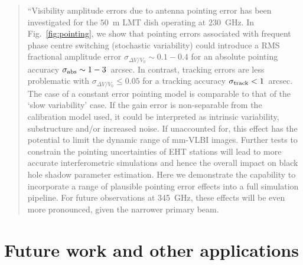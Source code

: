 \begin{quotation}
``Visibility amplitude errors due to antenna pointing error has been investigated for the $50$~m  LMT dish operating at $230$~GHz. In Fig.~\ref{fig:pointing}, we show that pointing errors associated with frequent phase centre switching (stochastic variability) could introduce a RMS fractional amplitude error $\sigma_{\Delta V/V_0} \sim 0.1 - 0.4$ for an absolute pointing accuracy  $\sigma_{\rm abs} \sim 1-3$~arcsec. In contrast, tracking errors are less problematic with $\sigma_{\Delta V/V_0} \le 0.05$ for a tracking accuracy  $\sigma_{\rm track}<1$~arcsec. The case of a constant error pointing model is comparable to that of the `slow variability' case. If the gain error is non-separable from the calibration model used, it could be interpreted as intrinsic variability, substructure and/or increased noise. If unaccounted for, this effect has the potential to limit the dynamic range of mm-VLBI images. Further tests to constrain the pointing uncertainties of EHT stations will lead to more accurate interferometric simulations and hence the overall impact on black hole shadow parameter estimation. Here we demonstrate the capability to incorporate a range of plausible pointing error effects into a full simulation pipeline. For future observations at 345~GHz, these effects will be even more pronounced, given the narrower primary beam.\\
\citep{Blecher_2016}
\end{quotation}









\section{Future work and other applications}\label{sec:improv}

